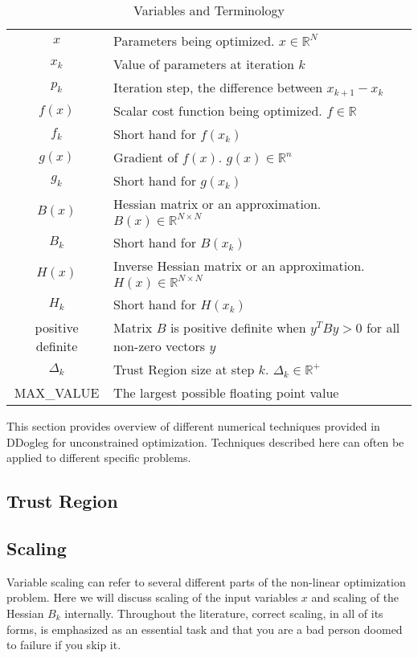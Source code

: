 \documentclass[peerreview,compsoc,onecolumn]{IEEEtran}
\newcommand{\R}{\mathbb{R}}
\begin{document}
\begin{table}[h]
\centering
\caption{Variables and Terminology}
\begin{tabular}{cl}
$x$ & Parameters being optimized. $x \in \R^N$ \\
$x_k$ & Value of parameters at iteration $k$ \\
$p_k$ & Iteration step, the difference between $x_{k+1}-x_k$ \\
$f(x)$ & Scalar cost function being optimized. $f \in \R$ \\
$f_k$ & Short hand for $f(x_k)$ \\
$g(x)$ & Gradient of $f(x)$. $g(x) \in \R^n$ \\
$g_k$ & Short hand for $g(x_k)$ \\
$B(x)$ & Hessian matrix or an approximation. $B(x) \in \R^{N \times N}$ \\ 
$B_k$ & Short hand for $B(x_k)$ \\
$H(x)$ & Inverse Hessian matrix or an approximation. $H(x) \in \R^{N \times N}$  \\ 
$H_k$ & Short hand for $H(x_k)$ \\
positive definite & Matrix $B$ is positive definite when $y^T B y > 0$ for all non-zero vectors $y$  \\
$\Delta_k$ & Trust Region size at step $k$. $\Delta_k \in \R^{+}$\\
MAX\_VALUE & The largest possible floating point value
\end{tabular}
\end{table}

This section provides overview of different numerical techniques provided in DDogleg for unconstrained optimization. Techniques described here can often be applied to different specific problems.

\subsection{Trust Region}



\subsection{Scaling}
\label{section:scaling}

Variable scaling can refer to several different parts of the non-linear optimization problem. Here we will discuss scaling of the input variables $x$ and scaling of the Hessian $B_k$ internally. Throughout the literature, correct scaling, in all of its forms, is emphasized as an essential task and that you are a bad person doomed to failure if you skip it. 
\end{document}
